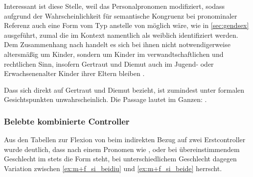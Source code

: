 Interessant ist diese Stelle, weil  das Personalpronomen
  modifiziert, sodass aufgrund der Wahrscheinlichkeit für
semantische Kongruenz bei pronominaler Referenz auch eine Form vom Typ
 anstelle von  möglich wäre, wie in \cref{sec:gendsex}
ausgeführt, zumal die   im Kontext namentlich als
weiblich identifiziert werden. Dem Zusammenhang nach handelt es sich bei ihnen
nicht notwendigerweise altersmäßig um Kinder, sondern um Kinder im
verwandt\-schaft\-lichen und rechtlichen Sinn, insofern Gertraut und Diemut
auch im Jugend- oder Erwachsenen\-alter Kinder ihrer Eltern bleiben
\autocites[\pno~2960, 240.31, 35]{cao4}[vgl.~auch][\pno~2719]{cao4}[569,
619]{caor}.

Dass sich  direkt auf Gertraut und Diemut bezieht, ist
zumindest unter formalen Gesichtspunkten unwahrscheinlich. Die Passage lautet
im Ganzen:  
\autocite[\pno~2960, 240.37--39]{cao4}.

\subsubsection{Belebte kombinierte Controller}

Aus den Tabellen  zur Flexion
von  beim indirekten Bezug auf zwei Erstcontroller wurde deutlich,
dass nach einem Pronomen wie
 ,   oder   bei übereinstimmendem Geschlecht im \CAO{} stets die Form
 steht, bei unterschiedlichem Geschlecht dagegen Variation zwischen
 \cref{ex:m+f_si_beidiu} und  \cref{ex:m+f_si_beide}
herrscht.

